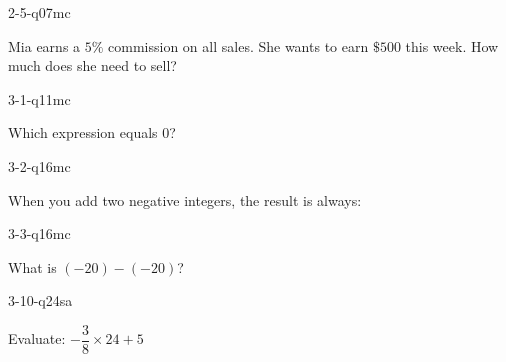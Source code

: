 \documentclass[12pt, fleqn, openany]{studyGuide}
\begin{document}
\begin{practiceQuestion}{2-5-q07}{mc}
\begin{questionText}
Mia earns a $5\%$ commission on all sales. She wants to earn $\$500$ this week. How much does she need to sell?
\end{questionText}
\end{practiceQuestion}

\begin{practiceQuestion}{3-1-q11}{mc}
\begin{questionText}
Which expression equals $0$?
\end{questionText}
\end{practiceQuestion}

\begin{practiceQuestion}{3-2-q16}{mc}
\begin{questionText}
When you add two negative integers, the result is always:
\end{questionText}
\end{practiceQuestion}

\begin{practiceQuestion}{3-3-q16}{mc}
\begin{questionText}
What is $(-20) - (-20)$?
\end{questionText}
\end{practiceQuestion}

\begin{practiceQuestion}{3-10-q24}{sa}
\begin{questionText}
Evaluate: $-\dfrac{3}{8} \times 24 + 5$
\end{questionText}
\end{practiceQuestion}
\end{document}
